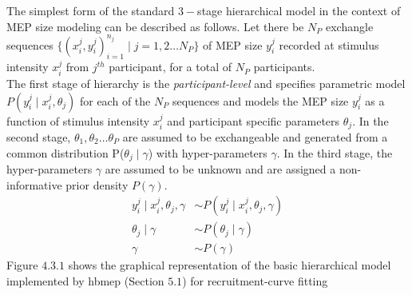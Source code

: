 \documentclass[a4paper,12pt]{article}
\begin{document}
The simplest form of the standard $3-$stage hierarchical model in the context of MEP size modeling can be described as follows. Let there be $N_P$ exchangle sequences $\{(x_i^j, y_i^j)_{i=1}^{n_j} \mid j = 1, 2 \ldots N_P\}$ of MEP size $y_i^j$ recorded at stimulus intensity $x_i^j$ from $j^{th}$ participant, for  a total of $N_P$ participants.\\

The first stage of hierarchy is the \textit{participant-level} and specifies parametric model $P(y_i^j \mid x_i^j, \theta_j)$ for each of the $N_P$ sequences and models the MEP size $y_i^j$ as a function of stimulus intensity $x_i^j$ and participant specific parameters $\theta_j$. In the second stage, $\theta_1, \theta_2 \ldots \theta_P$ are  assumed to be exchangeable and generated from  a common distribution P($\theta_j \mid \gamma$) with hyper-parameters $\gamma$. In the third stage, the hyper-parameters $\gamma$ are assumed to be unknown and are assigned a non-informative prior density $P(\gamma)$.
\begin{align*}
y_i^j \mid x_i^j, \theta_j, \gamma &\sim P(y_i^j \mid x_i^j, \theta_j, \gamma) \tag{4.3.1} \\
\theta_j \mid \gamma &\sim P(\theta_j \mid \gamma) \tag{4.3.2} \\
\gamma &\sim P(\gamma) \tag{4.3.3}
\end{align*}
Figure $4.3.1$ shows the graphical representation of the basic hierarchical model implemented by hbmep (Section $5.1$) for recruitment-curve fitting\\
\end{document}
